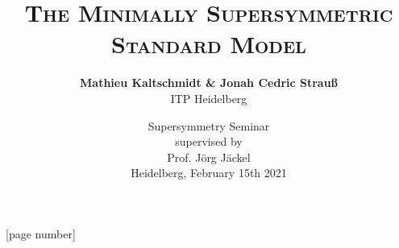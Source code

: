 \title{\LARGE\textsc{The Minimally Supersymmetric Standard Model}}
\author{\textbf{\large Mathieu Kaltschmidt \& Jonah Cedric Strau\ss} \\[0.5em]ITP Heidelberg}
\date{Supersymmetry Seminar\\
supervised by \\ Prof. J\"org J\"ackel \\[1em]
Heidelberg, February 15th 2021}




\beamertemplatenavigationsymbolsempty
{}



\usepackage{fontspec}


[page number]

\usepackage{amsmath}
\usepackage{amssymb}

\usepackage{polyglossia}
\setmainlanguage{english}


\usepackage{appendixnumberbeamer}
\usepackage{booktabs}
\usepackage{siunitx}
\usepackage{graphicx}
\usepackage{float}
\usepackage{blindtext}
\usepackage{physics}
\usepackage[labelfont=bf]{caption}

\usepackage{xcolor}

\usepackage{xfrac}

\usepackage[
	bibstyle=numeric-comp,
	backend=biber,
	isbn=false,
	date=year,
	url=false,
	doi=false,
	hyperref = auto, 
	maxnames=99,
	backref, 
	backrefstyle=none]{biblatex}


